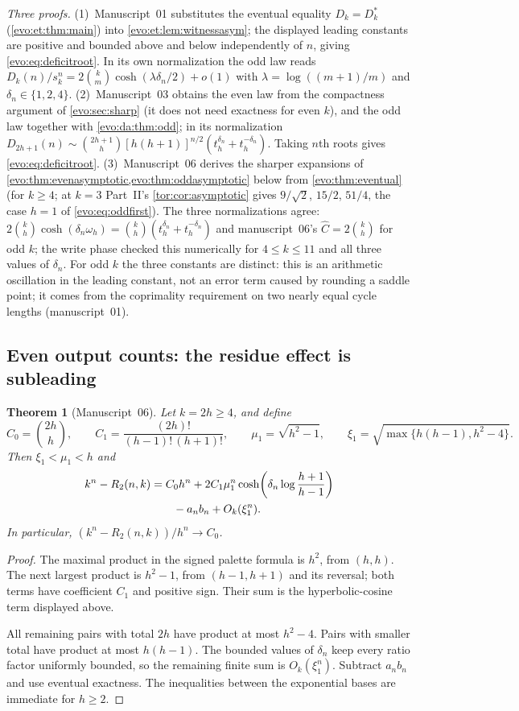 \documentclass[11pt,a4paper]{article}
\numberwithin{equation}{section}
\newtheorem{theorem}{Theorem}[section]
\theoremstyle{definition}
\theoremstyle{remark}
\begin{document}
\emph{Three proofs.} (1)~Manuscript~01 substitutes the eventual equality
$D_k=D^*_k$ (\cref{evo:et:thm:main}) into \cref{evo:et:lem:witnessasym}; the
displayed leading constants are positive and bounded above and below
independently of $n$, giving \eqref{evo:eq:deficitroot}. In its own
normalization the odd law reads $D_k(n)/s_k^n=2\binom km\cosh(\lambda\delta_n/2)
+o(1)$ with $\lambda=\log((m+1)/m)$ and $\delta_n\in\{1,2,4\}$.
(2)~Manuscript~03 obtains the even law from the compactness argument of
\cref{evo:sec:sharp} (it does not need exactness for even $k$), and the odd law
together with \cref{evo:da:thm:odd}; in its normalization
$D_{2h+1}(n)\sim\binom{2h+1}{h}[h(h+1)]^{n/2}(t_h^{\delta_n}+t_h^{-\delta_n})$.
Taking $n$th roots gives \eqref{evo:eq:deficitroot}. (3)~Manuscript~06 derives
the sharper expansions of \cref{evo:thm:evenasymptotic,evo:thm:oddasymptotic}
below from \cref{evo:thm:eventual} (for $k\ge4$; at $k=3$ Part~II's
\cref{tor:cor:asymptotic} gives $9/\sqrt2$, $15/2$, $51/4$, the case $h=1$ of
\eqref{evo:eq:oddfirst}). The three normalizations agree: $2\binom kh\cosh
(\delta_n\omega_h)=\binom kh(t_h^{\delta_n}+t_h^{-\delta_n})$ and manuscript~06's
$\hat C=2\binom kh$ for odd $k$; the write phase checked this numerically for
$4\le k\le11$ and all three values of $\delta_n$. For odd $k$ the three
constants are distinct: this is an arithmetic oscillation in the leading
constant, not an error term caused by rounding a saddle point; it comes from
the coprimality requirement on two nearly equal cycle lengths
(manuscript~01).

\subsection{Even output counts: the residue effect is subleading}

\begin{theorem}[Manuscript~06]\label{evo:thm:evenasymptotic}
Let $k=2h\ge4$, and define
\[
 C_0=\binom{2h}{h},\qquad
 C_1=\frac{(2h)!}{(h-1)!\,(h+1)!},\qquad
 \mu_1=\sqrt{h^2-1},\qquad
 \xi_1=\sqrt{\max\{h(h-1),h^2-4\}}.
\]
Then $\xi_1<\mu_1<h$ and
\begin{align}
 k^n-R_2(n,k)
 &=C_0h^n
   +2C_1\mu_1^n
      \cosh\!\left(\delta_n\log\frac{h+1}{h-1}\right)\notag\\
 &\qquad-a_nb_n+O_k(\xi_1^n).
 \label{evo:eq:evenexpansion}
\end{align}
In particular, $(k^n-R_2(n,k))/h^n\to C_0$.
\end{theorem}
\begin{proof}
The maximal product in the signed palette formula is $h^2$, from $(h,h)$.
The next largest product is $h^2-1$, from $(h-1,h+1)$ and its reversal; both
terms have coefficient $C_1$ and positive sign. Their sum is the
hyperbolic-cosine term displayed above.

All remaining pairs with total $2h$ have product at most $h^2-4$. Pairs with
smaller total have product at most $h(h-1)$. The bounded values of
$\delta_n$ keep every ratio factor uniformly bounded, so the remaining finite
sum is $O_k(\xi_1^n)$. Subtract $a_nb_n$ and use eventual exactness. The
inequalities between the exponential bases are immediate for $h\ge2$.
\end{proof}
\end{document}
